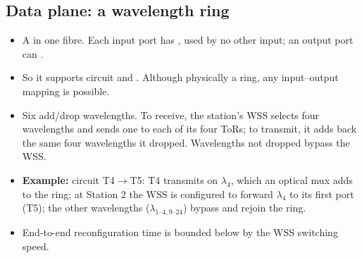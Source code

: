 \subsection{Data plane: a wavelength ring}
\begin{itemize}
\item A  in one fibre. Each input port has , used by no other input; an output port can .
\item So it supports circuit  and . Although physically a ring, any input--output mapping is possible.
\item Six  add/drop wavelengths. To receive, the station's WSS selects four wavelengths and sends one to each of its four ToRs; to transmit, it adds back the same four wavelengths it dropped. Wavelengths not dropped bypass the WSS.
\item \textbf{Example:} circuit T4$\to$T5: T4 transmits on $\lambda_4$, which an optical mux adds to the ring; at Station 2 the WSS is configured to forward $\lambda_4$ to its first port (T5); the other wavelengths ($\lambda_{1\text{--}4,9\text{--}24}$) bypass and rejoin the ring.
\item End-to-end reconfiguration time is bounded below by the WSS switching speed.
\end{itemize}

